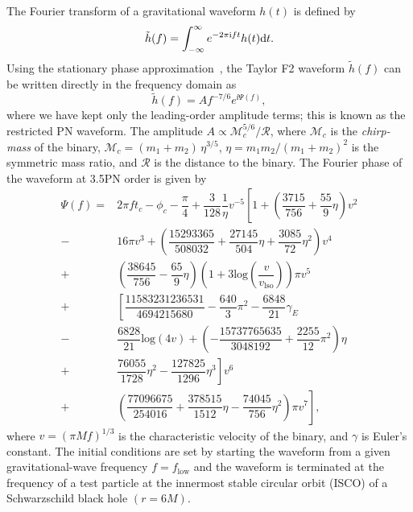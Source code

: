 The Fourier transform of a gravitational waveform $h(t)$
is defined by
\begin{equation}
\tilde{h}(f) = \int^{\infty}_{-\infty}e^{-2\pi {\rm i} ft}h(t)\mathrm{d} t.
\end{equation}
Using the stationary phase approximation~\cite{MatthewsWalker}, the Taylor F2
waveform $\tilde{h}(f)$ can be written  directly in the frequency domain as
\begin{equation}\label{eq:hfSPA}
\tilde{h}(f) = Af^{-7/6}e^{ \ii \Psi(f)},
\end{equation}
where we have kept only the leading-order amplitude terms; this is known as
the restricted PN waveform. The amplitude $A\propto \mathcal{M}_c^{5/6}/\mathcal{R}$, 
where $\mathcal{M}_c$ is the \textit{chirp-mass} of the binary, 
$\mathcal{M}_c = (m_1+m_2)\,\eta^{3/5}$, $\eta=m_1m_2/(m_1+m_2)^2$ is the symmetric mass ratio, and $\mathcal{R}$ is the distance to
the binary. The Fourier phase of the waveform at 3.5PN order is given by~\cite{Sathyaprakash:1991mt,Cutler:1994ys,GW2PN,Blanchet:2001ax,Blanchet:2004ek,Poisson:1995ef,Allen:2005fk}
\begin{equation}
\begin{split}\label{eq:PsiSPA}
\Psi(f)=&2\pi ft_c-\phi_c-\dfrac{\pi}{4} + \dfrac{3}{128}\dfrac{1}{\eta}v^{-5}\left[1 + \left(\dfrac{3715}{756} +\dfrac{55}{9}\eta\right)v^2\right.\\
-&\left. 16\pi v^3+\left(\dfrac{15293365}{508032}+\dfrac{27145}{504}\eta +\dfrac{3085}{72}\eta^2 \right)v^4\right.\\
+&\left.\left(\dfrac{38645}{756}-\dfrac{65}{9}\eta\right)\left(1+3\textrm{log}\left(\dfrac{v}{v_{\textrm{lso}}}\right)\right)\pi v^5\right.\\
+&\left.\left[\dfrac{11583231236531}{4694215680}-\dfrac{640}{3}\pi^2 -\dfrac{6848}{21}\gamma_E\right.\right.\\
-&\left.\left. \dfrac{6828}{21}\textrm{log}(4v)+\left(-\dfrac{15737765635}{3048192}+\dfrac{2255}{12}\pi^2 \right)\eta\right.\right.\\
+&\left.\left.\dfrac{76055}{1728}\eta^2 -\dfrac{127825}{1296}\eta^3\right] v^6\right.\\
+&\left.\left(\dfrac{77096675}{254016}+\dfrac{378515}{1512}\eta -\dfrac{74045}{756}\eta^2 \right)\pi v^7\right],
\end{split}
\end{equation}
where  $v=(\pi
Mf)^{1/3}$ is the characteristic velocity of the binary, and $\gamma$ is
Euler's constant.  The initial conditions are set by starting the waveform
from a given gravitational-wave frequency $f=f_{\mathrm{low}}$ and the
waveform is terminated at the frequency of a test particle at the innermost
stable circular orbit (ISCO) of a Schwarzschild black hole $(r = 6M)$.

